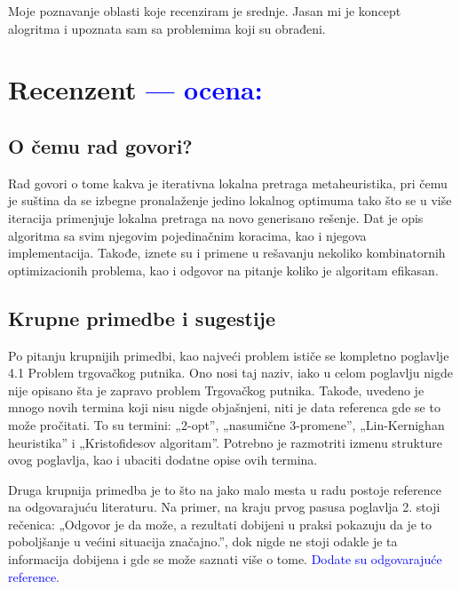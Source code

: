 \documentclass[a4paper]{report}
\newcommand{\odgovor}[1]{\textcolor{blue}{#1}}
\begin{document}
Moje poznavanje oblasti koje recenziram je srednje. Jasan mi je koncept alogritma i upoznata sam sa problemima koji su obrađeni.


\chapter{Recenzent \odgovor{--- ocena:} }


\section{O čemu rad govori?}
Rad govori o tome kakva je iterativna lokalna pretraga metaheuristika, pri čemu je suština da se izbegne pronalaženje jedino lokalnog optimuma tako što se u više iteracija primenjuje lokalna pretraga na novo generisano rešenje. Dat je opis algoritma sa svim njegovim pojedinačnim koracima, kao i njegova implementacija. Takođe, iznete su i primene u rešavanju nekoliko kombinatornih optimizacionih problema, kao i odgovor na pitanje koliko je algoritam efikasan.

\section{Krupne primedbe i sugestije}
Po pitanju krupnijih primedbi, kao najveći problem ističe se kompletno poglavlje 4.1 Problem trgovačkog putnika. Ono nosi taj naziv, iako u celom poglavlju nigde nije opisano šta je zapravo problem Trgovačkog putnika. Takođe, uvedeno je mnogo novih termina koji nisu nigde objašnjeni, niti je data referenca gde se to može pročitati. To su termini: „2-opt”, „nasumične 3-promene”, „Lin-Kernighan heuristika” i „Kristofidesov algoritam”. Potrebno je razmotriti izmenu strukture ovog poglavlja, kao i ubaciti dodatne opise ovih termina.

Druga krupnija primedba je to što na jako malo mesta u radu postoje reference na odgovarajuću literaturu. Na primer, na kraju prvog pasusa poglavlja 2. stoji rečenica: „Odgovor je da može, a rezultati dobijeni u praksi pokazuju da je to poboljšanje u većini situacija značajno.”, dok nigde ne stoji odakle je ta informacija dobijena i gde se može saznati više o tome. \newline
\odgovor{Dodate su odgovarajuće reference.\\}
\end{document}
